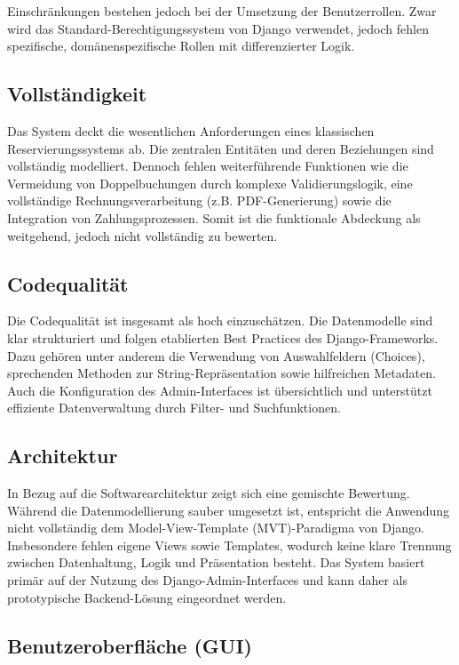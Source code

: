 Einschränkungen bestehen jedoch bei der Umsetzung der Benutzerrollen. Zwar wird das Standard-Berechtigungssystem von Django verwendet, jedoch fehlen spezifische, domänenspezifische Rollen mit differenzierter Logik.

\subsection{Vollständigkeit}

Das System deckt die wesentlichen Anforderungen eines klassischen Reservierungssystems ab. Die zentralen Entitäten und deren Beziehungen sind vollständig modelliert. Dennoch fehlen weiterführende Funktionen wie die Vermeidung von Doppelbuchungen durch komplexe Validierungslogik, eine vollständige Rechnungsverarbeitung (z.B. PDF-Generierung) sowie die Integration von Zahlungsprozessen. Somit ist die funktionale Abdeckung als weitgehend, jedoch nicht vollständig zu bewerten.

\subsection{Codequalität}

Die Codequalität ist insgesamt als hoch einzuschätzen. Die Datenmodelle sind klar strukturiert und folgen etablierten Best Practices des Django-Frameworks. Dazu gehören unter anderem die Verwendung von Auswahlfeldern (Choices), sprechenden Methoden zur String-Repräsentation sowie hilfreichen Metadaten. Auch die Konfiguration des Admin-Interfaces ist übersichtlich und unterstützt effiziente Datenverwaltung durch Filter- und Suchfunktionen.

\subsection{Architektur}

In Bezug auf die Softwarearchitektur zeigt sich eine gemischte Bewertung. Während die Datenmodellierung sauber umgesetzt ist, entspricht die Anwendung nicht vollständig dem Model-View-Template (MVT)-Paradigma von Django. Insbesondere fehlen eigene Views sowie Templates, wodurch keine klare Trennung zwischen Datenhaltung, Logik und Präsentation besteht. Das System basiert primär auf der Nutzung des Django-Admin-Interfaces und kann daher als prototypische Backend-Lösung eingeordnet werden.

\subsection{Benutzeroberfläche (GUI)}

